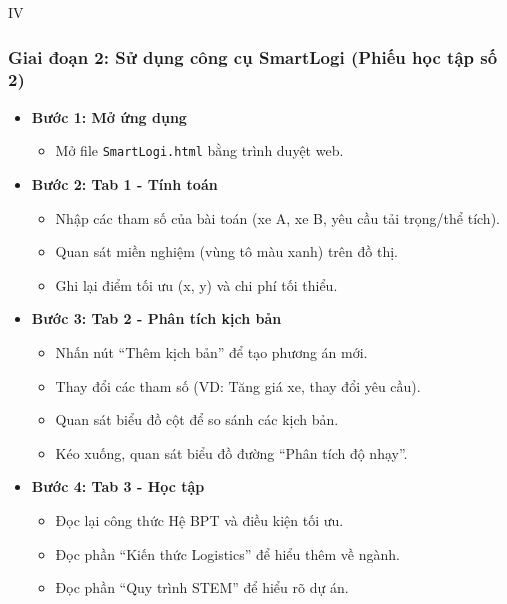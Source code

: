 \documentclass[12pt,a4paper]{article}
\begin{document}
\begin{competitionsection}{IV}
\subsubsection*{Giai đoạn 2: Sử dụng công cụ SmartLogi (Phiếu học tập số 2)}
\begin{itemize}[leftmargin=*,noitemsep]
\item \textbf{Bước 1: Mở ứng dụng}
    \begin{itemize}
    \item Mở file \texttt{SmartLogi.html} bằng trình duyệt web.
    \end{itemize}
\item \textbf{Bước 2: Tab 1 - Tính toán}
    \begin{itemize}
    \item Nhập các tham số của bài toán (xe A, xe B, yêu cầu tải trọng/thể tích).
    \item Quan sát miền nghiệm (vùng tô màu xanh) trên đồ thị.
    \item Ghi lại điểm tối ưu (x, y) và chi phí tối thiểu.
    \end{itemize}
\item \textbf{Bước 3: Tab 2 - Phân tích kịch bản}
    \begin{itemize}
    \item Nhấn nút ``Thêm kịch bản'' để tạo phương án mới.
    \item Thay đổi các tham số (VD: Tăng giá xe, thay đổi yêu cầu).
    \item Quan sát biểu đồ cột để so sánh các kịch bản.
    \item Kéo xuống, quan sát biểu đồ đường ``Phân tích độ nhạy''.
    \end{itemize}
\item \textbf{Bước 4: Tab 3 - Học tập}
    \begin{itemize}
    \item Đọc lại công thức Hệ BPT và điều kiện tối ưu.
    \item Đọc phần ``Kiến thức Logistics'' để hiểu thêm về ngành.
    \item Đọc phần ``Quy trình STEM'' để hiểu rõ dự án.
    \end{itemize}
\end{itemize}


\end{competitionsection}
\end{document}
